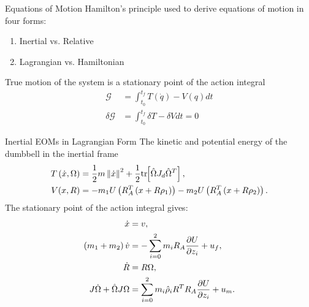 \begin{frame}{Equations of Motion}
    Hamilton's principle used to derive equations of motion in four forms:
    \begin{enumerate}
        \item Inertial vs. Relative 
        \item Lagrangian vs. Hamiltonian
    \end{enumerate}
    True motion of the system is a stationary point of the action integral
    \begin{align*}
        \mathcal{G} &= \int_{t_0}^{t_f} T(\dot q) - V(q) dt\\
        \delta \mathcal{G} &= \int_{t_0}^{t_f} \delta T - \delta V dt = 0
    \end{align*}
\end{frame}

\begin{frame}{Inertial EOMs in Lagrangian Form}
    The kinetic and potential energy of the dumbbell in the inertial frame
    \begin{align*}
        T\left( \dot{x}, \Omega \right) &= \frac{1}{2} m \left\| \dot{x} \right\|^2 + \frac{1}{2} \mathrm{tr}\negthickspace\left[ \hat{\Omega} J_d \hat{\Omega}^T \right] , \\
        V( x, R ) &=  - m_1 U \left( R_A^T \left( x + R \rho_1 \right) \right) - m_2 U \left( R_A^T \left( x + R \rho_2 \right) \right). 
    \end{align*}
    The stationary point of the action integral gives:
    \begin{align*}
        \dot{x} &= v, \\
        \left( m_1 + m_2 \right) \dot{v} &= - \sum_{i=0}^2 m_i R_A \frac{\partial U}{\partial z_i} + u_f, \\
        \dot{R} &= R \Omega, \\
        J \dot{\Omega} + \hat{\Omega} J \Omega &= \sum_{i=0}^2 m_i \hat{\rho}_i R^T R_A \frac{\partial U}{\partial z_i} + u_m. 
    \end{align*}
\end{frame}

